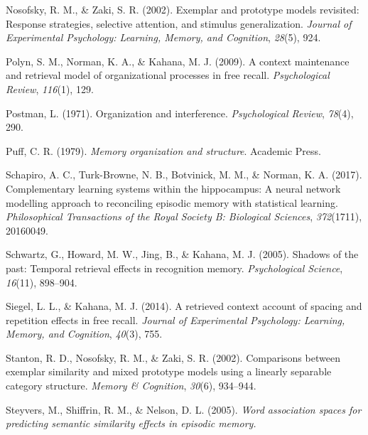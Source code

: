 \documentclass[
  letterpaper,
]{article}
\newlength{\cslhangindent}
\newlength{\cslentryspacingunit} %
\newenvironment{CSLReferences}[2] %
 {%
  \setlength{\parindent}{0pt}
  \ifodd #1
  \let\oldpar\par
  \def\par{\hangindent=\cslhangindent\oldpar}
  \fi
  \setlength{\parskip}{#2\cslentryspacingunit}
 }%
 {}
\begin{document}
\begin{CSLReferences}{1}{0}
\leavevmode{}%
Nosofsky, R. M., \& Zaki, S. R. (2002). Exemplar and prototype models
revisited: Response strategies, selective attention, and stimulus
generalization. \emph{Journal of Experimental Psychology: Learning,
Memory, and Cognition}, \emph{28}(5), 924.

\leavevmode{}%
Polyn, S. M., Norman, K. A., \& Kahana, M. J. (2009). A context
maintenance and retrieval model of organizational processes in free
recall. \emph{Psychological Review}, \emph{116}(1), 129.

\leavevmode{}%
Postman, L. (1971). Organization and interference. \emph{Psychological
Review}, \emph{78}(4), 290.

\leavevmode{}%
Puff, C. R. (1979). \emph{Memory organization and structure}. Academic
Press.

\leavevmode{}%
Schapiro, A. C., Turk-Browne, N. B., Botvinick, M. M., \& Norman, K. A.
(2017). Complementary learning systems within the hippocampus: A neural
network modelling approach to reconciling episodic memory with
statistical learning. \emph{Philosophical Transactions of the Royal
Society B: Biological Sciences}, \emph{372}(1711), 20160049.

\leavevmode{}%
Schwartz, G., Howard, M. W., Jing, B., \& Kahana, M. J. (2005). Shadows
of the past: Temporal retrieval effects in recognition memory.
\emph{Psychological Science}, \emph{16}(11), 898--904.

\leavevmode{}%
Siegel, L. L., \& Kahana, M. J. (2014). A retrieved context account of
spacing and repetition effects in free recall. \emph{Journal of
Experimental Psychology: Learning, Memory, and Cognition}, \emph{40}(3),
755.

\leavevmode{}%
Stanton, R. D., Nosofsky, R. M., \& Zaki, S. R. (2002). Comparisons
between exemplar similarity and mixed prototype models using a linearly
separable category structure. \emph{Memory \& Cognition}, \emph{30}(6),
934--944.

\leavevmode{}%
Steyvers, M., Shiffrin, R. M., \& Nelson, D. L. (2005). \emph{Word
association spaces for predicting semantic similarity effects in
episodic memory.}


\end{CSLReferences}
\end{document}
